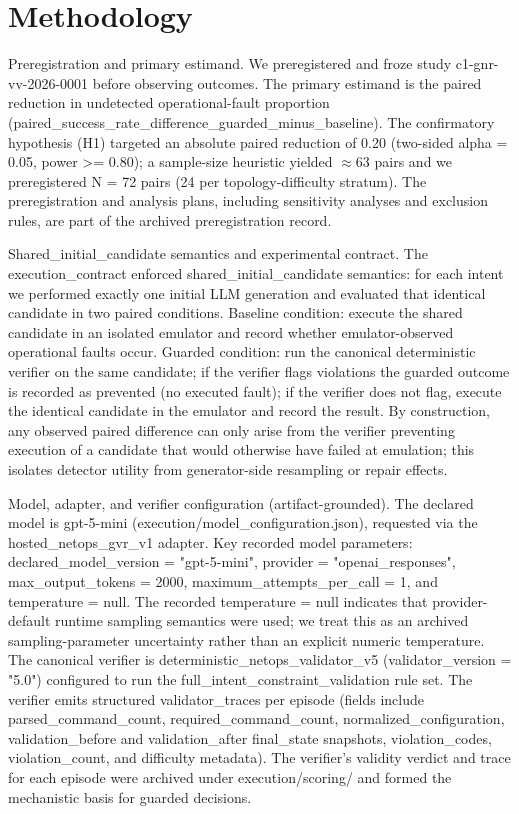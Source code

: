 \documentclass[conference]{IEEEtran}
\begin{document}
\section{Methodology}
Preregistration and primary estimand. We preregistered and froze study c1-gnr-vv-2026-0001 before observing outcomes. The primary estimand is the paired reduction in undetected operational-fault proportion (paired\_success\_rate\_difference\_guarded\_minus\_baseline). The confirmatory hypothesis (H1) targeted an absolute paired reduction of 0.20 (two-sided alpha = 0.05, power >= 0.80); a sample-size heuristic yielded \ensuremath{\approx}63 pairs and we preregistered N = 72 pairs (24 per topology-difficulty stratum). The preregistration and analysis plans, including sensitivity analyses and exclusion rules, are part of the archived preregistration record.

Shared\_initial\_candidate semantics and experimental contract. The execution\_contract enforced shared\_initial\_candidate semantics: for each intent we performed exactly one initial LLM generation and evaluated that identical candidate in two paired conditions. Baseline condition: execute the shared candidate in an isolated emulator and record whether emulator-observed operational faults occur. Guarded condition: run the canonical deterministic verifier on the same candidate; if the verifier flags violations the guarded outcome is recorded as prevented (no executed fault); if the verifier does not flag, execute the identical candidate in the emulator and record the result. By construction, any observed paired difference can only arise from the verifier preventing execution of a candidate that would otherwise have failed at emulation; this isolates detector utility from generator-side resampling or repair effects.

Model, adapter, and verifier configuration (artifact-grounded). The declared model is gpt-5-mini (execution/model\_configuration.json), requested via the hosted\_netops\_gvr\_v1 adapter. Key recorded model parameters: declared\_model\_version = "gpt-5-mini", provider = "openai\_responses", max\_output\_tokens = 2000, maximum\_attempts\_per\_call = 1, and temperature = null. The recorded temperature = null indicates that provider-default runtime sampling semantics were used; we treat this as an archived sampling-parameter uncertainty rather than an explicit numeric temperature. The canonical verifier is deterministic\_netops\_validator\_v5 (validator\_version = "5.0") configured to run the full\_intent\_constraint\_validation rule set. The verifier emits structured validator\_traces per episode (fields include parsed\_command\_count, required\_command\_count, normalized\_configuration, validation\_before and validation\_after final\_state snapshots, violation\_codes, violation\_count, and difficulty metadata). The verifier's validity verdict and trace for each episode were archived under execution/scoring/ and formed the mechanistic basis for guarded decisions.
\end{document}
